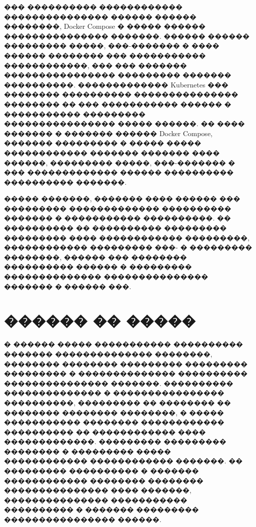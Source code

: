 ��� ���������� ������������ ��������������� ������ ������ ��������, Docker Compose � ����� ������ ��������������� �������. ������ ������ ��������� �����, ���-������� � ���� ������ �������� ��� ����������� ������������, ��� ��� ������� ���������������� ��������� ������� ����������. ������������� Kubernetes ��� �������� ���������� ��������������� �������� �� ��� ����������� ������ � ����������� ��������� ���������������� ����� ������. �� ���� ������� � ������� ������ Docker Compose, ������� ��������� � ����� ����� ������������ ������� ������� ���� ������, ��������� �����, ���-������� � ��� ������������� ������ ���������� ���������� �������\cite{docker_compose_docs}.

����� �������, ������� ���� ������ ��� ��������� ������������� ���������� ������� � ����������� ����������. �� ���������� �� ���������� ��������� ��������� ���� ������������ ���������, ������������ ��������� ���- � ��������� ��������, ������ ��� �������� ���������� ������ � ��������� �������������� ��������������� ������� � ������ ���.

\section{������ �� �����}

� ������ ����� ����������� ���������� ������� �������������� ��������, �������� �������� ��������� ��������� ��������� � �������������� ���������� ��������������� �������. ���������� �������������� � ���������������� ����������, ��������� �� �������� �� �������� �������� ��������, � ����� ����������� �������� ������������ ���������� �� ������������ ���� �������������. ��������� ��������� �������� � ��������� ����� ������������ ������������ �������. �� ��������� ���������� � ������� ������������ �������� �������� ��������������� ���� �������, ��������������� ����������� ���������� � ������� ��������� ���������������� ������.
